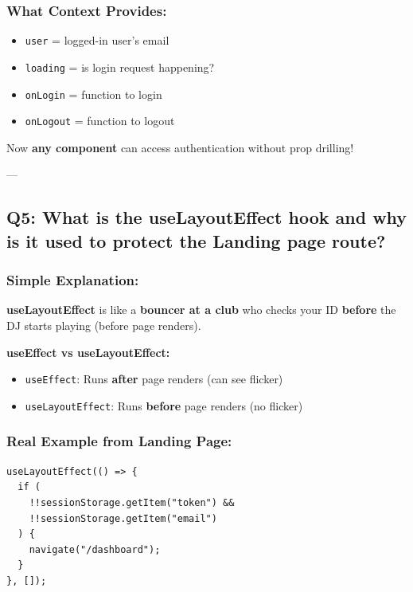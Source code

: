 \documentclass[12pt]{article}
\begin{document}
\subsubsection*{What Context Provides:}

\begin{itemize}
    \item \texttt{user} = logged-in user's email
    \item \texttt{loading} = is login request happening?
    \item \texttt{onLogin} = function to login
    \item \texttt{onLogout} = function to logout
\end{itemize}

Now \textbf{any component} can access authentication without prop drilling!

---

\subsection{Q5: What is the useLayoutEffect hook and why is it used to protect the Landing page route?}

\subsubsection*{Simple Explanation:}

\textbf{useLayoutEffect} is like a \textbf{bouncer at a club} who checks your ID \textbf{before} the DJ starts playing (before page renders).

\textbf{useEffect vs useLayoutEffect:}

\begin{itemize}
    \item \texttt{useEffect}: Runs \textbf{after} page renders (can see flicker)
    \item \texttt{useLayoutEffect}: Runs \textbf{before} page renders (no flicker)
\end{itemize}

\subsubsection*{Real Example from Landing Page:}

\begin{lstlisting}
useLayoutEffect(() => {
  if (
    !!sessionStorage.getItem("token") &&
    !!sessionStorage.getItem("email")
  ) {
    navigate("/dashboard");
  }
}, []);
\end{lstlisting}
\end{document}
